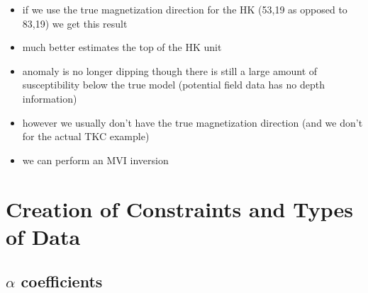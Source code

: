 \begin{itemize}
  \item if we use the true magnetization direction for the HK (53,19 as opposed to 83,19) we get this result
  \item much better estimates the top of the HK unit
  \item anomaly is no longer dipping though there is still a large amount of susceptibility below the true model (potential field data has no depth information)
  \item however we usually don't have the true magnetization direction (and we don't for the actual TKC example)
\end{itemize}

\begin{itemize}
  \item we can perform an \ac{MVI} inversion
\end{itemize}





%
%
%
%
%

\section{Creation of Constraints and Types of Data}
\label{sec:Creation of Constraints:TKC}




\subsection{$\alpha$ coefficients}
\label{sec:alpha coefficients:TKC}


